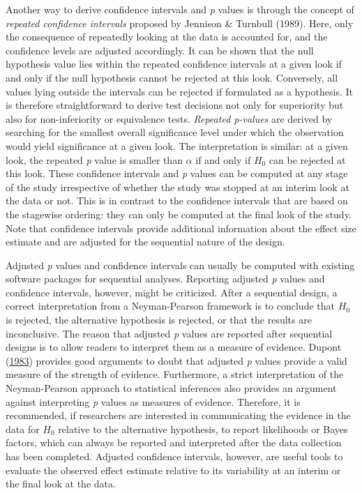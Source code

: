 \documentclass[
  english,
  ,jou, a4paper,floatsintext]{apa6}
\begin{document}
Another way to derive confidence intervals and \emph{p} values is through the concept of \emph{repeated confidence intervals} proposed by Jennison \& Turnbull (1989). Here, only the consequence of repeatedly looking at the data is accounted for, and the confidence levels are adjusted accordingly. It can be shown that the null hypothesis value lies within the repeated confidence intervals at a given look if and only if the null hypothesis cannot be rejected at this look. Conversely, all values lying outside the intervals can be rejected if formulated as a hypothesis. It is therefore straightforward to derive test decisions not only for superiority but also for non-inferiority or equivalence tests. \emph{Repeated p-values} are derived by searching for the smallest overall significance level under which the observation would yield significance at a given look. The interpretation is similar: at a given look, the repeated \emph{p} value is smaller than \(\alpha\) if and only if \(H_0\) can be rejected at this look. These confidence intervals and \emph{p} values can be computed at any stage of the study irrespective of whether the study was stopped at an interim look at the data or not. This is in contrast to the confidence intervals that are based on the stagewise ordering: they can only be computed at the final look of the study. Note that confidence intervals provide additional information about the effect size estimate and are adjusted for the sequential nature of the design.

Adjusted \emph{p} values and confidence intervals can usually be computed with existing software packages for sequential analyses. Reporting adjusted \emph{p} values and confidence intervals, however, might be criticized. After a sequential design, a correct interpretation from a Neyman-Pearson framework is to conclude that \(H_0\) is rejected, the alternative hypothesis is rejected, or that the results are inconclusive. The reason that adjusted \emph{p} values are reported after sequential designs is to allow readers to interpret them as a measure of evidence. Dupont (\protect\hyperlink{ref-dupont_sequential_1983}{1983}) provides good arguments to doubt that adjusted \emph{p} values provide a valid measure of the strength of evidence. Furthermore, a strict interpretation of the Neyman-Pearson approach to statistical inferences also provides an argument against interpreting \emph{p} values as measures of evidence. Therefore, it is recommended, if researchers are interested in communicating the evidence in the data for \(H_0\) relative to the alternative hypothesis, to report likelihoods or Bayes factors, which can always be reported and interpreted after the data collection has been completed. Adjusted confidence intervals, however, are useful tools to evaluate the observed effect estimate relative to its variability at an interim or the final look at the data.
\end{document}
